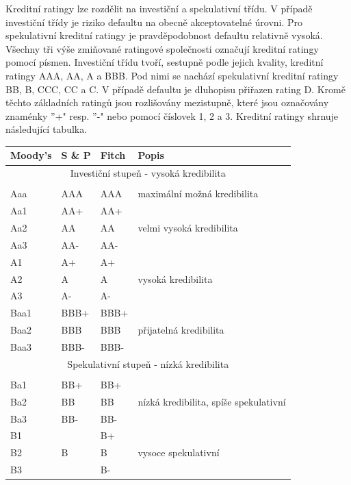 \documentclass[a4paper]{book}
\begin{document}
Kreditní ratingy lze rozdělit na investiční a spekulativní třídu. V případě investiční třídy je riziko defaultu na obecně akceptovatelné úrovni. Pro spekulativní kreditní ratingy je pravděpodobnost defaultu relativně vysoká. Všechny tři výše zmiňované ratingové společnosti označují kreditní ratingy pomocí písmen. Investiční třídu tvoří, sestupně podle jejich kvality, kreditní ratingy AAA, AA, A a BBB. Pod nimi se nachází spekulativní kreditní ratingy BB, B, CCC, CC a C. V případě defaultu je dluhopisu přiřazen rating D. Kromě těchto základních ratingů jsou rozlišovány mezistupně, které jsou označovány znaménky ''+" resp. ''-" nebo pomocí číslovek 1, 2 a 3. Kreditní ratingy shrnuje následující tabulka.
\begin{center}
\begin{tabular}{l l l l}
\textbf{Moody's} & \textbf{S \& P} & \textbf{Fitch} & \textbf{Popis}\\
\hline
\hline
\multicolumn{4}{c}{Investiční stupeň - vysoká kredibilita}\\
\multicolumn{4}{c}{}\\
\hline
Aaa  & AAA  & AAA  & maximální možná kredibilita\\
\hline
Aa1  & AA+  & AA+  & \multirow{3}{*}{velmi vysoká kredibilita}\\
Aa2  & AA   & AA   & \\
Aa3  & AA-  & AA-  & \\
\hline
A1   & A+   & A+   & \multirow{3}{*}{vysoká kredibilita}\\
A2   & A    & A    & \\
A3   & A-   & A-   & \\
\hline
Baa1 & BBB+ & BBB+ & \multirow{3}{*}{přijatelná kredibilita}\\
Baa2 & BBB  & BBB  & \\
Baa3 & BBB- & BBB- & \\
\hline
\hline
\multicolumn{4}{c}{Spekulativní stupeň - nízká kredibilita}\\
\multicolumn{4}{c}{}\\
\hline
Ba1  & BB+  & BB+  & \multirow{3}{*}{nízká kredibilita, spíše spekulativní}\\
Ba2  & BB   & BB   & \\
Ba3  & BB-  & BB-  & \\
\hline
B1   & \multirow{3}{*}{B} & B+   & \multirow{3}{*}{vysoce spekulativní}\\
B2   &      & B    & \\
B3   &      & B-   & \\

\end{tabular}
\end{center}
\end{document}
